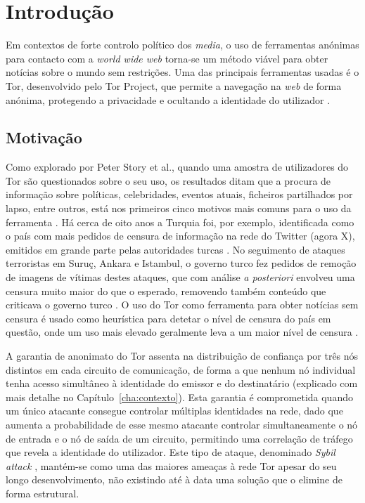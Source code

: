 
%

\chapter{Introdução}
\label{cha:introducao}

Em contextos de forte controlo político dos \textit{media}, o uso de ferramentas anónimas para contacto com a \textit{world wide web} torna-se um método viável para obter notícias sobre o mundo sem restrições. Uma das principais ferramentas usadas é o Tor, desenvolvido pelo Tor Project, que permite a navegação na \textit{web} de forma anónima, protegendo a privacidade e ocultando a identidade do utilizador \cite{tor}.

\section*{Motivação}
Como explorado por Peter Story et al., quando uma amostra de utilizadores do Tor são questionados sobre o seu uso, os resultados ditam que a procura de informação sobre políticas, celebridades, eventos atuais, ficheiros partilhados por lapso, entre outros, está nos primeiros cinco motivos mais comuns para o uso da ferramenta \cite{story2022increasing}. Há cerca de oito anos a Turquia foi, por exemplo, identificada como o país com mais pedidos de censura de informação na rede do Twitter (agora X), emitidos em grande parte pelas autoridades turcas \cite{sandberg2017geography}. No seguimento de ataques terroristas em Suruç, Ankara e Istambul, o governo turco fez pedidos de remoção de imagens de vítimas destes ataques, que com análise \textit{a posteriori} envolveu uma censura muito maior do que o esperado, removendo também conteúdo que criticava o governo turco \cite{sandberg2017geography}. O uso do Tor como ferramenta para obter notícias sem censura é usado como heurística para detetar o nível de censura do país em questão, onde um uso mais elevado geralmente leva a um maior nível de censura \cite{sandberg2017geography}.

A garantia de anonimato do Tor assenta na distribuição de confiança por três nós distintos em cada circuito de comunicação, de forma a que nenhum nó individual tenha acesso simultâneo à identidade do emissor e do destinatário (explicado com mais detalhe no Capítulo~\ref{cha:contexto}). Esta garantia é comprometida quando um único atacante consegue controlar múltiplas identidades na rede, dado que aumenta a probabilidade de esse mesmo atacante controlar simultaneamente o nó de entrada e o nó de saída de um circuito, permitindo uma correlação de tráfego que revela a identidade do utilizador. Este tipo de ataque, denominado \textit{Sybil attack} \cite{douceur2002sybil}, mantém-se como uma das maiores ameaças à rede Tor apesar do seu longo desenvolvimento, não existindo até à data uma solução que o elimine de forma estrutural.

